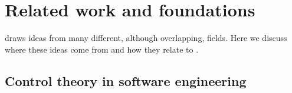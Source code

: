 
\section{Related work and foundations}
\label{sec:rw}

\projectname{} draws ideas from many different, although overlapping, fields. Here we discuss where these ideas come from and how they relate to \projectname{}.

\textcolor{blue}{}


\subsection{Control theory in software engineering}

